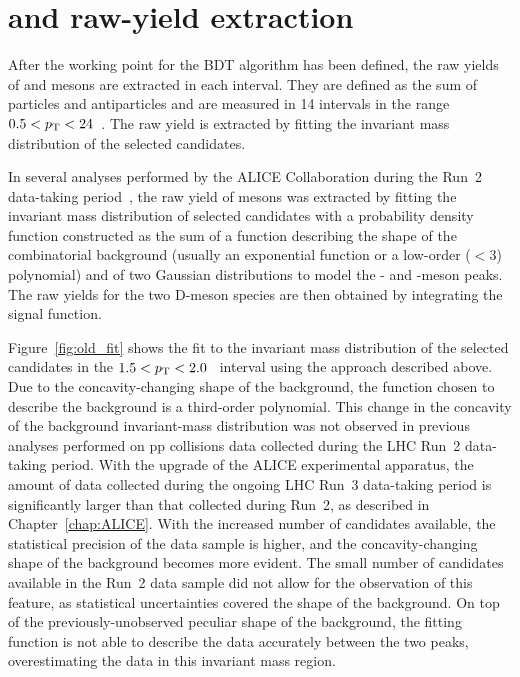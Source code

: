 \section{\texorpdfstring{\ds and \dpl raw-yield extraction}{Ds+ and D+ mesons raw-yield extraction}}

After the working point for the BDT algorithm has been defined, the raw yields of \ds and \dpl mesons are extracted in each \pt interval. They are defined as the sum of particles and antiparticles and are measured in 14 \pt intervals in the range $0.5<p_\mathrm{T}<24$~\gevc. The raw yield is extracted by fitting the invariant mass distribution of the selected candidates. 

In several analyses performed by the ALICE Collaboration during the Run~2 data-taking period~\cite{ALICE:2021mgk,ALICE:2023sgl,ALICE:2021kfc}, the raw yield of \ds mesons was extracted by fitting the invariant mass distribution of selected candidates with a probability density function constructed as the sum of a function describing the shape of the combinatorial background (usually an exponential function or a low-order ($<3$) polynomial) and of two Gaussian distributions to model the \ds- and \dpl-meson peaks. The raw yields for the two D-meson species are then obtained by integrating the signal function. 

Figure~\ref{fig:old_fit} shows the fit to the invariant mass distribution of the selected candidates in the \mbox{$1.5<p_\mathrm{T}<2.0$~\gevc} interval using the approach described above. Due to the concavity-changing shape of the background, the function chosen to describe the background is a third-order polynomial. This change in the concavity of the background invariant-mass distribution was not observed in previous analyses performed on pp collisions data collected during the LHC Run~2 data-taking period. With the upgrade of the ALICE experimental apparatus, the amount of data collected during the ongoing LHC Run~3 data-taking period is significantly larger than that collected during Run~2, as described in Chapter~\ref{chap:ALICE}. With the increased number of candidates available, the statistical precision of the data sample is higher, and the concavity-changing shape of the background becomes more evident. The small number of candidates available in the Run~2 data sample did not allow for the observation of this feature, as statistical uncertainties covered the shape of the background. On top of the previously-unobserved peculiar shape of the background, the fitting function is not able to describe the data accurately between the two peaks, overestimating the data in this invariant mass region.

